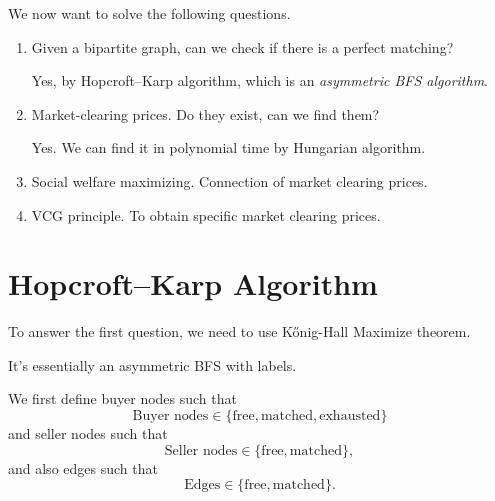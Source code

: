 \begin{problem}
We now want to solve the following questions.
\begin{enumerate}
	\item Given a bipartite graph, can we check if there is a perfect matching?
	      \begin{answer}
		      Yes, by Hopcroft–Karp algorithm, which is an \emph{asymmetric BFS algorithm}.
	      \end{answer}
	\item Market-clearing prices. Do they exist, can we find them?
	      \begin{answer}
		      Yes. We can find it in polynomial time by Hungarian algorithm.
	      \end{answer}
	\item Social welfare maximizing. Connection of market clearing prices.
	\item VCG principle. To obtain specific market clearing prices.
\end{enumerate}
\end{problem}

\section{Hopcroft–Karp Algorithm}
\label{Hopcroft-Karp Algorithm}
To answer the first question, we need to use Kőnig-Hall Maximize theorem.
\begin{intuition}
	It's essentially an asymmetric BFS with labels.
\end{intuition}

We first define buyer nodes such that
\[
	\text{Buyer nodes}\in \{\text{free}, \text{matched}, \text{exhausted}   \}
\]
and seller nodes such that
\[
	\text{Seller nodes}\in \{\text{free}, \text{matched}\},
\]
and also edges such that
\[
	\text{Edges}\in \{\text{free}, \text{matched}\}.
\]

